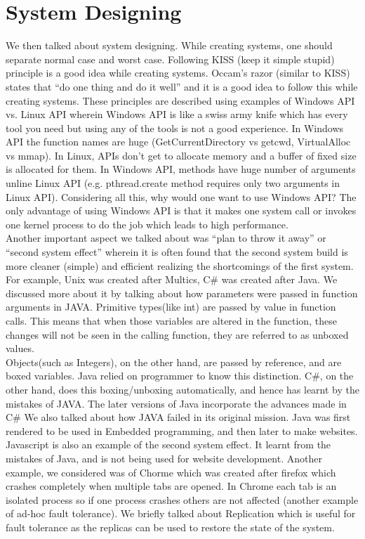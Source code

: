 \documentclass[twoside]{article}
\begin{document}
\section{System Designing}
We then talked about system designing. While creating systems, one should separate normal case and worst case. Following KISS (keep it simple stupid) principle is a good idea while creating systems. Occam’s razor (similar to KISS) states that “do one thing and do it well” and it is a good idea to follow this while creating systems. These principles are described using examples of Windows API vs. Linux API wherein Windows API is like a swiss army knife which has every tool you need but using any of the tools is not a good experience.  In Windows API the function names are huge (GetCurrentDirectory vs getcwd, VirtualAlloc vs mmap). In Linux, APIs don’t get to allocate memory and a buffer of fixed size is allocated for them. In Windows API, methods have huge number of arguments unline Linux API (e.g. pthread.create method requires only two arguments in Linux API). Considering all this, why would one want to use Windows API? The only advantage of using Windows API is that it makes one system call or invokes one kernel process to do the job which leads to high performance. 
\\
Another important aspect we talked about was “plan to throw it away” or “second system effect” wherein it is often found that the second system build is more cleaner (simple) and efficient realizing the shortcomings of the first system. For example, Unix was created after Multics, C\# was created after Java. We discussed more about it by talking about how parameters were passed in function arguments in JAVA. Primitive types(like int) are passed by value in function calls. This means that when those variables are altered in the function, these changes will not be seen in the calling function, they are referred to as unboxed values.\\ Objects(such as Integers), on the other hand, are passed by reference, and are boxed variables. Java relied on programmer to know this distinction. C\#, on the other hand, does this boxing/unboxing automatically, and hence has learnt by the mistakes of JAVA. The later versions of Java incorporate the advances made in C\# We also talked about how JAVA failed in its original mission. Java was first rendered to be used in Embedded programming, and then later to make websites. Javascript is also an example of the second system effect. It learnt from the mistakes of Java, and is not being used for website development. Another example, we considered was of Chorme which was created after firefox which crashes completely when multiple tabs are opened. In Chrome each tab is an isolated process so if one process crashes others are not affected (another example of ad-hoc fault tolerance).  We briefly talked about Replication which is useful for fault tolerance as the replicas can be used to restore the state of the system. 
\end{document}
